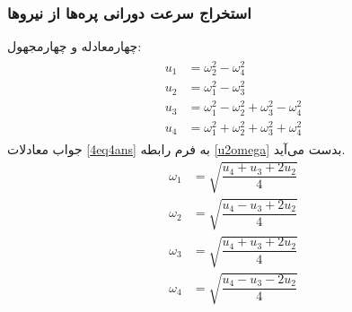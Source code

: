 \subsubsection{استخراج سرعت دورانی پره‌ها از نیروها}
چهارمعادله و چهارمجهول:
\begin{align}\label{4eq4ans}
	\begin{split}
		u_1 &= \omega_2^2 - \omega_4^2\\
		u_2 &= \omega_1^2 - \omega_3^2\\
		u_3 &= \omega_1^2 - \omega_2^2  + \omega_3^2 - \omega_4^2\\
		u_4 &= \omega_1^2 + \omega_2^2  + \omega_3^2 + \omega_4^2
	\end{split}
\end{align}
جواب معادلات 
\ref{4eq4ans}
به فرم رابطه 
\ref{u2omega}
بدست می‌آید.
\begin{equation}\label{u2omega}
	\begin{split}
		\omega_1 &= \sqrt{\dfrac{u_4 + u_3 +2u_2}{4}}\\[1em]
		\omega_2 &= \sqrt{\dfrac{u_4 - u_3 +2u_2}{4}}\\[1em]
		\omega_3 &= \sqrt{\dfrac{u_4 + u_3 +2u_2}{4}}\\[1em]
		\omega_4 &= \sqrt{\dfrac{u_4 - u_3 -2u_2}{4}}
	\end{split}
\end{equation}
